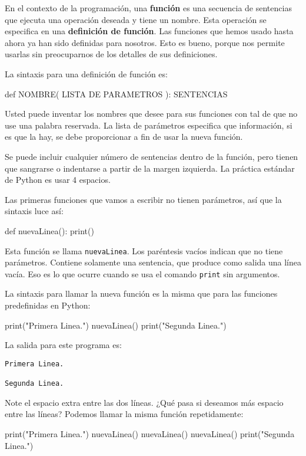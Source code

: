 En el contexto de la programación, una \textbf{función} es una secuencia
de sentencias que ejecuta una operación deseada y tiene un nombre.
Esta operación se especifica en una \textbf{definición de función}.
Las funciones que hemos usado hasta ahora ya han sido definidas para
nosotros. Esto es bueno, porque nos permite usarlas sin preocuparnos
de los detalles de sus definiciones.

  

La sintaxis para una definición de función es:

\begin{pythoncode}
def NOMBRE( LISTA DE PARAMETROS ):
  SENTENCIAS
\end{pythoncode}
 Usted puede inventar los nombres que desee para sus funciones con
tal de que no use una palabra reservada. La lista de parámetros especifica
que información, si es que la hay, se debe proporcionar a fin de usar
la nueva función.

Se puede incluir cualquier número de sentencias dentro de la función,
pero tienen que sangrarse o indentarse a partir de la margen izquierda.
La práctica estándar de Python es usar 4 espacios.

Las primeras funciones que vamos a escribir no tienen parámetros,
así que la sintaxis luce así:

\begin{pythoncode}
def nuevaLinea():
  print()
\end{pythoncode}
 Esta función se llama \texttt{nuevaLinea}. Los paréntesis vacíos
indican que no tiene parámetros. Contiene solamente una sentencia,
que produce como salida una línea vacía. Eso es lo que ocurre cuando
se usa el comando \texttt{print} sin argumentos.

La sintaxis para llamar la nueva función es la misma que para las
funciones predefinidas en Python:

\begin{pythoncode}
print("Primera Linea.")
nuevaLinea()
print("Segunda Linea.")
\end{pythoncode}
 La salida para este programa es:
\begin{verbatim}
Primera Linea.

Segunda Linea.
\end{verbatim}
Note el espacio extra entre las dos líneas. ¿Qué pasa si deseamos
más espacio entre las líneas? Podemos llamar la misma función repetidamente:

\begin{pythoncode}
print("Primera Linea.")
nuevaLinea()
nuevaLinea()
nuevaLinea()
print("Segunda Linea.")
\end{pythoncode}
 

